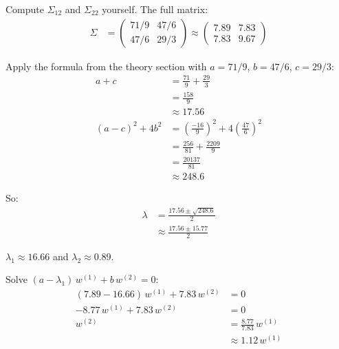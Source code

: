 Compute $\Sigma_{12}$ and $\Sigma_{22}$ yourself. The full matrix:
\begin{align*}
    \Sigma &= \begin{pmatrix} 71/9 & 47/6 \\ 47/6 & 29/3 \end{pmatrix}
            \approx \begin{pmatrix} 7.89 & 7.83 \\ 7.83 & 9.67 \end{pmatrix}
\end{align*}


 Apply the formula from the theory section with $a = 71/9$, $b = 47/6$, $c = 29/3$:
\begin{align*}
    a + c &= \frac{71}{9} + \frac{29}{3} \\
           &= \frac{158}{9} \\
           &\approx 17.56 \\[6pt]
    (a - c)^2 + 4b^2 &= \left(\frac{-16}{9}\right)^{\!2} + 4\left(\frac{47}{6}\right)^{\!2} \\
                       &= \frac{256}{81} + \frac{2209}{9} \\
                       &= \frac{20137}{81} \\
                       &\approx 248.6
\end{align*}

So:
\begin{align*}
    \lambda &= \frac{17.56 \pm \sqrt{248.6}}{2} \\
            &\approx \frac{17.56 \pm 15.77}{2}
\end{align*}

$\lambda_1 \approx 16.66$ and $\lambda_2 \approx 0.89$.

Solve $(a - \lambda_1)\,w^{(1)} + b\,w^{(2)} = 0$:
\begin{align*}
    (7.89 - 16.66)\,w^{(1)} + 7.83\,w^{(2)} &= 0 \\
    -8.77\,w^{(1)} + 7.83\,w^{(2)} &= 0 \\
    w^{(2)} &= \frac{8.77}{7.83}\,w^{(1)} \\
            &\approx 1.12\,w^{(1)}
\end{align*}

